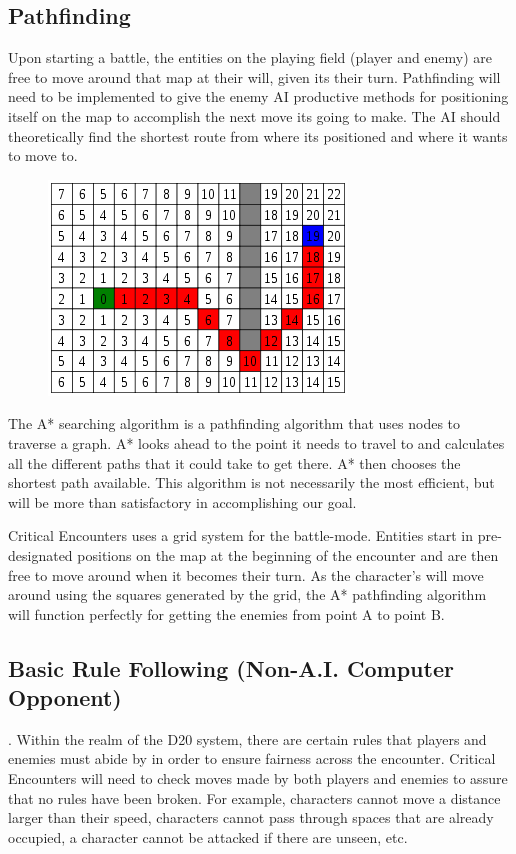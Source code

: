 \documentclass[12pt,a4paper]{report}
\begin{document}
		\subsection{Pathfinding}
			
			Upon starting a battle, the entities on the playing field (player and enemy) are free to move around that map at their will, given its their turn. Pathfinding will need to be implemented to give the enemy AI productive methods for positioning itself on the map to accomplish the next move its going to make. The AI should theoretically find the shortest route from where its positioned and where it wants to move to.
			
			\begin{figure}
				\includegraphics[scale=0.5]{aStar}
			\end{figure}
			The A* searching algorithm is a pathfinding algorithm that uses nodes to traverse a graph. A* looks ahead to the point it needs to travel to and calculates all the different paths that it could take to get there. A* then chooses the shortest path available. This algorithm is not necessarily the most efficient, but will be more than satisfactory in accomplishing our goal.
			
			Critical Encounters uses a grid system for the battle-mode. Entities start in pre-designated positions on the map at the beginning of the encounter and are then free to move around when it becomes their turn. As the character's will move around using the squares generated by the grid, the A* pathfinding algorithm will function perfectly for getting the enemies from point A to point B.
		\subsection{Basic Rule Following (Non-A.I. Computer Opponent)}.
			Within the realm of the D20 system, there are certain rules that players and enemies must abide by in order to ensure fairness across the encounter. Critical Encounters will need to check moves made by both players and enemies to assure that no rules have been broken. For example, characters cannot move a distance larger than their speed, characters cannot pass through spaces that are already occupied, a character cannot be attacked if there are unseen, etc. 
			
\end{document}
